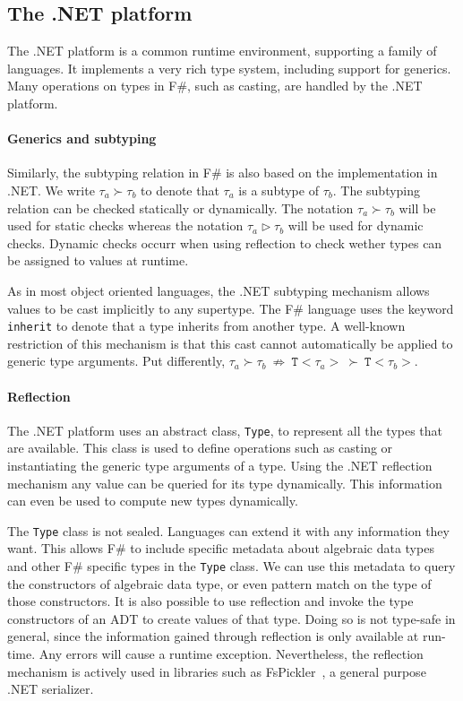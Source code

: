\documentclass{sigplanconf}
\begin{document}
\subsection{The .NET platform}
The .NET platform is a common runtime environment, supporting
a family of languages. It implements a very rich type
system, including support for generics. Many operations on types
in F\#, such as casting, are handled by the .NET platform. 

\paragraph{Generics and subtyping}

Similarly, the subtyping relation in F\# is also based on the
implementation in .NET.  We write $\tau_a \succ \tau_b$ to denote that
$\tau_a$ is a subtype of $\tau_b$. The subtyping relation can be
checked statically or dynamically. The notation $\tau_a \succ \tau_b$
will be used for static checks whereas the notation $\tau_a \triangleright \tau_b$
will be used for dynamic checks. Dynamic checks occurr when using reflection
to check wether types can be assigned to values at runtime.

As in most object oriented languages, the .NET subtyping mechanism
allows values to be cast implicitly to any supertype.  The F\#
language uses the keyword \verb+inherit+ to denote that a type
inherits from another type. A well-known restriction of this mechanism
is that this cast cannot automatically be applied to generic type
arguments. Put differently, $\tau_a \succ \tau_b\ \not\Rightarrow\
\mathtt{T}{<}\tau_a{>} \ \succ \ \mathtt{T}{<}\tau_b{>}$.

\paragraph{Reflection}

The .NET platform uses an abstract class, \verb+Type+, to represent
all the types that are available. This class is used to define
operations such as casting or instantiating the generic type arguments
of a type. Using the .NET reflection mechanism any value can be
queried for its type dynamically. This information can even be used to
compute new types dynamically.

The \verb+Type+ class is not sealed. Languages can extend it with any
information they want. This allows F\# to include specific metadata
about algebraic data types and other F\# specific types in the
\verb+Type+ class.  We can use this metadata to query the constructors
of algebraic data type, or even pattern match on the type of those
constructors. It is also possible to use reflection and invoke the
type constructors of an ADT to create values of that type. Doing
so is not type-safe in general, since the information gained through
reflection is only available at run-time. Any errors will cause a
runtime exception. Nevertheless, the reflection mechanism is actively
used in libraries such as FsPickler~\cite{FsPickler}, a general
purpose .NET serializer.
\end{document}

